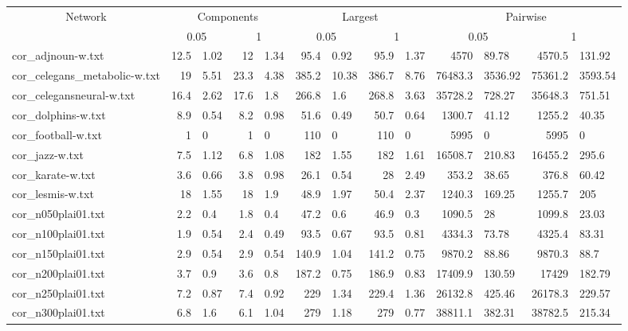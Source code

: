 \begin{tabular}{l r@{$\,\pm\,$}l r@{$\,\pm\,$}l r@{$\,\pm\,$}l r@{$\,\pm\,$}l r@{$\,\pm\,$}l r@{$\,\pm\,$}l}
\hline
\multicolumn{1}{c}{Network} & \multicolumn{4}{c}{Components} & \multicolumn{4}{c}{Largest} & \multicolumn{4}{c}{Pairwise}\\
\multicolumn{1}{c}{} & \multicolumn{2}{c}{0.05} & \multicolumn{2}{c}{1} & \multicolumn{2}{c}{0.05} & \multicolumn{2}{c}{1} & \multicolumn{2}{c}{0.05} & \multicolumn{2}{c}{1} \\
\hline
cor\_adjnoun-w.txt & 12.5 & 1.02 & 12 & 1.34 & 95.4 & 0.92 & 95.9 & 1.37 & 4570 & 89.78 & 4570.5 & 131.92 \\
cor\_celegans\_metabolic-w.txt & 19 & 5.51 & 23.3 & 4.38 & 385.2 & 10.38 & 386.7 & 8.76 & 76483.3 & 3536.92 & 75361.2 & 3593.54 \\
cor\_celegansneural-w.txt & 16.4 & 2.62 & 17.6 & 1.8 & 266.8 & 1.6 & 268.8 & 3.63 & 35728.2 & 728.27 & 35648.3 & 751.51 \\
cor\_dolphins-w.txt & 8.9 & 0.54 & 8.2 & 0.98 & 51.6 & 0.49 & 50.7 & 0.64 & 1300.7 & 41.12 & 1255.2 & 40.35 \\
cor\_football-w.txt & 1 & 0 & 1 & 0 & 110 & 0 & 110 & 0 & 5995 & 0 & 5995 & 0 \\
cor\_jazz-w.txt & 7.5 & 1.12 & 6.8 & 1.08 & 182 & 1.55 & 182 & 1.61 & 16508.7 & 210.83 & 16455.2 & 295.6 \\
cor\_karate-w.txt & 3.6 & 0.66 & 3.8 & 0.98 & 26.1 & 0.54 & 28 & 2.49 & 353.2 & 38.65 & 376.8 & 60.42 \\
cor\_lesmis-w.txt & 18 & 1.55 & 18 & 1.9 & 48.9 & 1.97 & 50.4 & 2.37 & 1240.3 & 169.25 & 1255.7 & 205 \\
cor\_n050plai01.txt & 2.2 & 0.4 & 1.8 & 0.4 & 47.2 & 0.6 & 46.9 & 0.3 & 1090.5 & 28 & 1099.8 & 23.03 \\
cor\_n100plai01.txt & 1.9 & 0.54 & 2.4 & 0.49 & 93.5 & 0.67 & 93.5 & 0.81 & 4334.3 & 73.78 & 4325.4 & 83.31 \\
cor\_n150plai01.txt & 2.9 & 0.54 & 2.9 & 0.54 & 140.9 & 1.04 & 141.2 & 0.75 & 9870.2 & 88.86 & 9870.3 & 88.7 \\
cor\_n200plai01.txt & 3.7 & 0.9 & 3.6 & 0.8 & 187.2 & 0.75 & 186.9 & 0.83 & 17409.9 & 130.59 & 17429 & 182.79 \\
cor\_n250plai01.txt & 7.2 & 0.87 & 7.4 & 0.92 & 229 & 1.34 & 229.4 & 1.36 & 26132.8 & 425.46 & 26178.3 & 229.57 \\
cor\_n300plai01.txt & 6.8 & 1.6 & 6.1 & 1.04 & 279 & 1.18 & 279 & 0.77 & 38811.1 & 382.31 & 38782.5 & 215.34 \\

\end{tabular}
